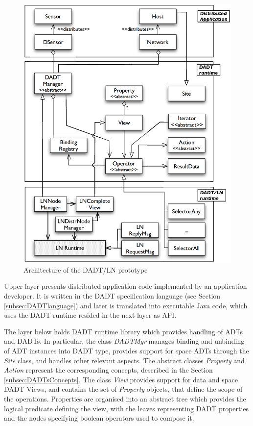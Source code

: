 \begin{figure}
\centering
\includegraphics[scale=0.65]{img/DADTLN_architecture.eps} 
\caption[DADT/LN architecture]{Architecture of the DADT/LN prototype}
\label{Fig:DADTLN_architecture}
\end{figure} 

Upper layer presents distributed application code implemented by an application
developer. It is written in the DADT specification language (see Section
\ref{subsec:DADTlanguage}) and later is translated into executable Java code,
which uses the DADT runtime resided in the next layer as API.

The layer below holds DADT runtime library which provides handling of ADTs and
DADTs. In particular, the class \emph{DADTMgr} manages binding and unbinding of
ADT instances into DADT type, provides support for space ADTs through the
\emph{Site} class, and handles other relevant aspects. 
The abstract classes \emph{Property} and \emph{Action} represent the
corresponding concepts, described in the Section \ref{subsec:DADTsConcepts}.
The class \emph{View} provides support for data and space DADT Views, and
contains the set of \emph{Property} objects, that define the scope of the
operations. Properties are organised into an abstract tree which provides the
logical predicate defining the view, with the leaves representing DADT
properties and the nodes specifying boolean operators used to compose it.

